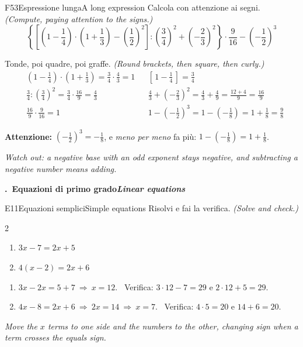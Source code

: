 \documentclass[11pt,a4paper]{article}
\newcommand{\en}[1]{\par{\small\itshape\color{engray}#1\par}}
\newcommand{\enx}[1]{{\small\itshape\color{engray}(#1)}}
\newcounter{sezione}
\newcommand{\sezione}[2]{%
  \par\addvspace{14pt}\Needspace{10\baselineskip}%
  \refstepcounter{sezione}%
  \noindent\begin{tcolorbox}[enhanced, colback=navy, colframe=navy, sharp corners,
      left=6pt, right=6pt, top=3pt, bottom=3pt, boxsep=0pt, before skip=0pt, after skip=6pt]
    {\color{white}\large\bfseries \thesezione.\ #1\hfill{\normalsize\itshape #2}}
  \end{tcolorbox}\par}
\newcommand{\errore}[2]{\begin{attenzione}\textbf{\color{fgA}Attenzione:} #1\par
  {\itshape\color{engray}Watch out: #2}\end{attenzione}}
\begin{document}
\begin{esercizio}{F5}{3}{Espressione lunga}{A long expression}
Calcola con attenzione ai segni. \enx{Compute, paying attention to the signs.}
\[\left\{\left[\left(1-\frac14\right)\cdot\left(1+\frac13\right)-\left(\frac12\right)^2\right]:\left(\frac34\right)^2+\left(-\frac23\right)^2\right\}\cdot\frac{9}{16}-\left(-\frac12\right)^3\]
\end{esercizio}
\begin{solbox}
Tonde, poi quadre, poi graffe. \enx{Round brackets, then square, then curly.}
\begin{align*}
&\left(1-\tfrac14\right)\cdot\left(1+\tfrac13\right)=\tfrac34\cdot\tfrac43=1
&&\left[\,1-\tfrac14\,\right]=\tfrac34\\
&\tfrac34:\left(\tfrac34\right)^2=\tfrac34\cdot\tfrac{16}{9}=\tfrac43
&&\tfrac43+\left(-\tfrac23\right)^2=\tfrac43+\tfrac49=\tfrac{12+4}{9}=\tfrac{16}{9}\\
&\tfrac{16}{9}\cdot\tfrac{9}{16}=1
&&1-\left(-\tfrac12\right)^3=1-\left(-\tfrac18\right)=1+\tfrac18=\boxed{\tfrac98}
\end{align*}
\errore{$\left(-\frac12\right)^3=-\frac18$, e \emph{meno per meno} fa più: $1-\left(-\frac18\right)=1+\frac18$.}
{a negative base with an odd exponent stays negative, and subtracting a negative number means adding.}
\end{solbox}

\sezione{Equazioni di primo grado}{Linear equations}

\begin{esercizio}{E1}{1}{Equazioni semplici}{Simple equations}
Risolvi e fai la verifica. \enx{Solve and check.}
\begin{multicols}{2}
\begin{enumerate}
\item $3x-7=2x+5$
\item $4(x-2)=2x+6$
\end{enumerate}
\end{multicols}
\end{esercizio}
\begin{solbox}
\begin{enumerate}
\item $3x-2x=5+7\ \Rightarrow\ \boxed{x=12}$. \ Verifica: $3\cdot12-7=29$ e $2\cdot12+5=29$. \checkmark
\item $4x-8=2x+6\ \Rightarrow\ 2x=14\ \Rightarrow\ \boxed{x=7}$. \ Verifica: $4\cdot5=20$ e $14+6=20$. \checkmark
\end{enumerate}
\en{Move the $x$ terms to one side and the numbers to the other, changing sign when a term crosses the equals sign.}
\end{solbox}
\end{document}
